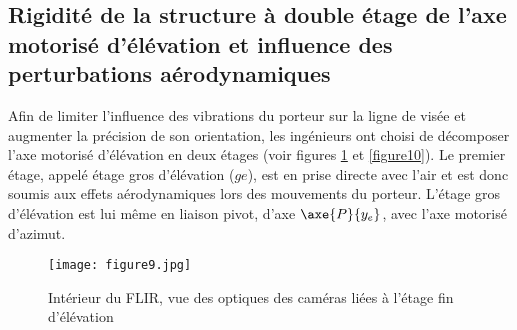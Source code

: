 
%
%


\subsection{Rigidité de la structure à double étage de l'axe motorisé d'élévation et influence des
perturbations aérodynamiques}


Afin de limiter l'influence des vibrations du porteur sur la
ligne de visée et augmenter la précision de son orientation,
les ingénieurs ont choisi de décomposer l'axe motorisé
d'élévation en deux étages (voir figures \ref{fig9} et \ref{figure10}).
Le premier étage, appelé étage gros d'élévation ($ge$), est
en prise directe avec l'air et est donc soumis aux effets
aérodynamiques lors des mouvements du porteur. L'étage
gros d'élévation est lui même en liaison pivot, d'axe $\axe{P}{{y_e}}$,
avec l'axe motorisé d'azimut.

\begin{figure}[h]
\begin{center}
\texttt{[image: figure9.jpg]}
\caption{Intérieur du FLIR, vue des optiques des caméras liées à l'étage fin d'élévation\label{fig9}}
\end{center}
\end{figure}


